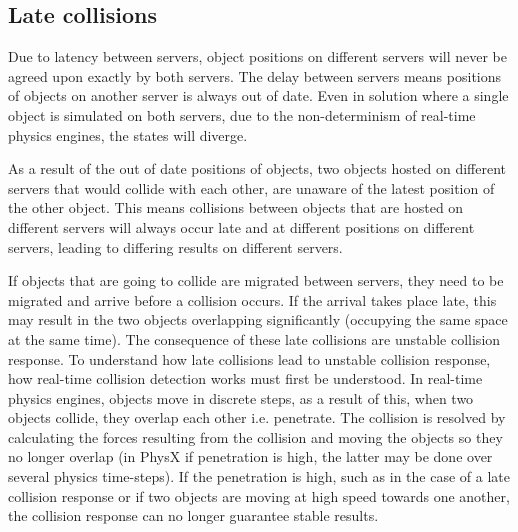 \subsection{Late collisions}\label{lateCollisions}
Due to latency between servers, object positions on different servers will never be agreed upon exactly by both servers. The delay between servers means positions of objects on another server is always out of date. Even in solution where a single object is simulated on both servers, due to the non-determinism of real-time physics engines, the states will diverge. 

As a result of the out of date positions of objects, two objects hosted on different servers that would collide with each other, are unaware of the latest position of the other object. This means collisions between objects that are hosted on different servers will always occur late and at different positions on different servers, leading to differing results on different servers.

If objects that are going to collide are migrated between servers, they need to be migrated and arrive before a collision occurs. If the arrival takes place late, this may result in the two objects overlapping significantly (occupying the same space at the same time). The consequence of these late collisions are unstable collision response. To understand how late collisions lead to unstable collision response, how real-time collision detection works must first be understood. In real-time physics engines, objects move in discrete steps, as a result of this, when two objects collide, they overlap each other i.e. penetrate. The collision is resolved by calculating the forces resulting from the collision and moving the objects so they no longer overlap (in PhysX if penetration is high, the latter may be done over several physics time-steps). If the penetration is high, such as in the case of a late collision response or if two objects are moving at high speed towards one another, the collision response can no longer guarantee stable results.


